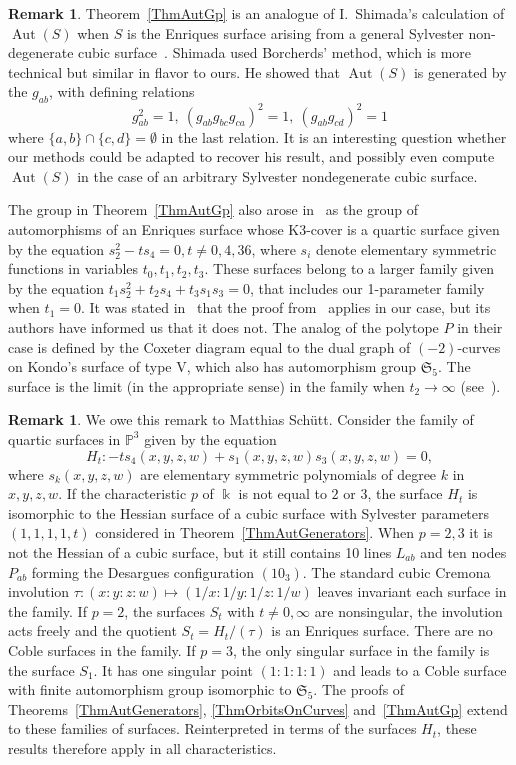 \documentclass[11pt]{article}
\theoremstyle{definition}
\newtheorem{rema}[theo]{Remark}
\numberwithin{equation}{section}
\numberwithin{figure}{section}
\numberwithin{table}{section}
\newcommand{\bbP}{{\mathbb{P}}}
\DeclareMathOperator{\Aut}{Aut}
\newcommand{\frakS}{\mathfrak{S}}
\begin{document}
\begin{rema}
Theorem~\ref{ThmAutGp} is an analogue of I.~Shimada's calculation of $\Aut(S)$ when $S$ is the Enriques surface arising from a general Sylvester non-degenerate cubic surface~\cite[Theorem~1.2]{Shimada}. Shimada used Borcherds' method, which is more technical but similar in flavor to ours. He showed that $\Aut(S)$ is generated by the $g_{ab}$, with defining relations
\[
g_{ab}^2 = 1, \ (g_{ab}g_{bc}g_{ca})^2 = 1,\ (g_{ab}g_{cd})^2 = 1
\]
where $\{a,b\}\cap \{c,d\} = \emptyset$ in the last relation. It is an interesting question whether our methods could be adapted to recover his result, and possibly even compute $\Aut(S)$ in the case of an arbitrary Sylvester nondegenerate cubic surface.

The group in Theorem~\ref{ThmAutGp} also arose in~\cite{Mukai} as the group of automorphisms of an Enriques surface whose K3-cover is a quartic surface given by the equation $s_2^2-ts_4 = 0, t\ne 0,4,36$, where $s_i$ denote elementary symmetric functions in variables $t_0,t_1,t_2,t_3$. These surfaces belong to a larger family given by the equation $t_1s_2^2+t_2s_4+t_3s_1s_3 = 0$, that includes our 1-parameter family when $t_1 = 0$. It was stated in~\cite{DolgachevSalem} that the proof from~\cite{Mukai} applies in our case, but its authors have informed us that it does not. The analog of the polytope $P$ in their case is defined by the Coxeter diagram equal to the dual graph of $(-2)$-curves on Kondo's surface of type V, which also has automorphism group $\frakS_5$. The surface is the limit (in the appropriate sense) in the family when $t_2\to \infty$ (see~\cite[Remark~2.3]{Mukai}).
\end{rema}

\begin{rema}
We owe this remark to Matthias Schütt. Consider the family of quartic surfaces in $\bbP^3$ given by the equation
\[
H_t:-ts_4(x,y,z,w)+s_1(x,y,z,w)s_3(x,y,z,w) = 0,
\]
where $s_k(x,y,z,w)$ are elementary symmetric polynomials of degree $k$ in $x,y,z,w$. If the characteristic $p$ of $\Bbbk$ is not equal to $2$ or $3$, the surface $H_t$ is isomorphic to the Hessian surface of a cubic surface with Sylvester parameters $(1,1,1,1,t)$ considered in Theorem~\ref{ThmAutGenerators}. When $p= 2,3$ it is not the Hessian of a cubic surface, but it still contains 10 lines $L_{ab}$ and ten nodes $P_{ab}$ forming the Desargues configuration $(10_3)$. The standard cubic Cremona involution $\tau:(x:y:z:w) \mapsto (1/x:1/y:1/z:1/w)$ leaves invariant each surface in the family. If $p = 2$, the surfaces $S_t$ with $t\ne 0,\infty$ are nonsingular, the involution acts freely and the quotient $S_t = H_t/(\tau)$ is an Enriques surface. There are no Coble surfaces in the family. If $p = 3$, the only singular surface in the family is the surface $S_1$. It has one singular point $(1{:}1{:}1{:}1)$ and leads to a Coble surface with finite automorphism group isomorphic to $\frakS_5$. The proofs of Theorems~\ref{ThmAutGenerators}, \ref{ThmOrbitsOnCurves} and~\ref{ThmAutGp} extend to these families of surfaces. Reinterpreted in terms of the surfaces $H_t$, these results therefore apply in all characteristics.
\end{rema}
\end{document}
